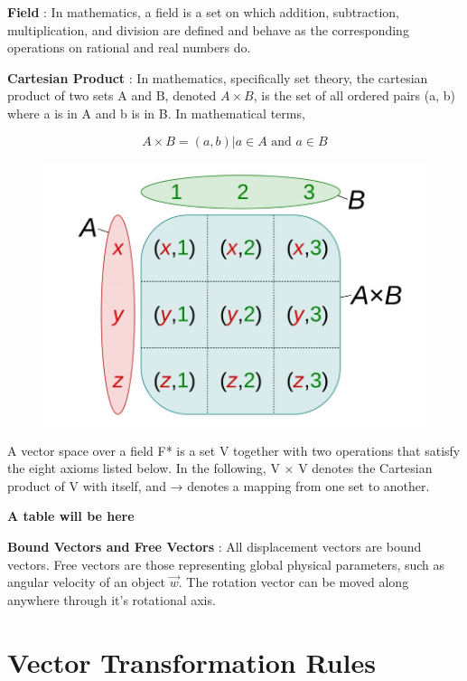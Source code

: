 \documentclass{article}
\begin{document}
	\textbf{Field} : In mathematics, a field is a set on which addition, subtraction, multiplication,
	and division are defined and behave as the corresponding operations on rational and real
	numbers do.
	
	\textbf{Cartesian Product} : In mathematics, specifically set theory, the cartesian product of two
	sets A and B, denoted $A \times B$, is the set of all ordered pairs (a, b) where a is in A and b
	is in B. In mathematical terms,
	
	$$A\times B = (a,b) | a\in A \text{ and } a\in B$$
	\begin{figure}[hbp]
		\begin{center}
			\includegraphics[scale=0.45]{4.jpg}
			\label{f4}
		\end{center}
	\end{figure}

	A vector space over a field F* is a set V together with two operations that satisfy the eight axioms listed below. In the following, V × V denotes the Cartesian product of V with itself, and → denotes a mapping from one set to another.
	
	\textbf{A table will be here}
	
	\textbf{Bound Vectors and Free Vectors} : All displacement vectors are bound vectors. Free vectors are those representing global physical parameters, such as angular velocity of an object $\overrightarrow{w}$. The rotation vector can be moved along anywhere through it’s rotational axis.
	
	\section*{Vector Transformation Rules}
		
\end{document}
